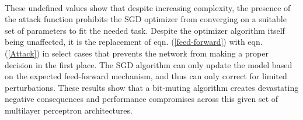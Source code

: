 \documentclass[12pt,letterpaper]{article}
\begin{document}
\paragraph*{}These undefined values show that despite increasing complexity, the presence of the attack function prohibits the SGD optimizer from converging on a suitable set of parameters to fit the needed task. Despite the optimizer algorithm itself being unaffected, it is the replacement of eqn. (\ref{feed-forward}) with eqn. (\ref{Attack}) in select cases that prevents the network from making a proper decision in the first place. The SGD algorithm can only update the model based on the expected feed-forward mechanism, and thus can only correct for limited perturbations. These results show that a bit-muting algorithm creates devastating negative consequences and performance compromises across this given set of multilayer perceptron architectures.

\end{document}
